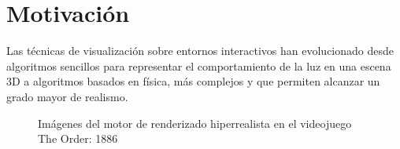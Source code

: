 











\section{Motivaci\'on}
Las t\'ecnicas de visualizaci\'on sobre entornos interactivos han evolucionado desde algoritmos sencillos para representar el comportamiento
de la luz en una escena 3D a algoritmos basados en f\'isica, m\'as complejos y que permiten alcanzar un grado mayor de realismo.

\begin{figure}[H]
    \vspace{0.5cm}
    \centering
    \caption{Im\'agenes del motor de renderizado hiperrealista en el videojuego The Order: 1886 \autocite{theorder}}
    \vspace{0.5cm}
\end{figure}

